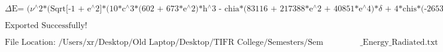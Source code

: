 \documentclass{article}
\begin{document}
\begin{doublespace}
\noindent\(\text{$\Delta $E= ($\nu {}^{\wedge}$2*(Sqrt[-1 + e${}^{\wedge}$2]*(10*c${}^{\wedge}$3*(602 + 673*e${}^{\wedge}$2)*h${}^{\wedge}$3 - chia*(83116
+ 217388*e${}^{\wedge}$2 + 40851*e${}^{\wedge}$4)*$\delta $ + 4*chis*(-26536 - 5757*$\delta {}^{\wedge}$2 + 10426*$\eta $ + 25720*$\nu $) + chis*e${}^{\wedge}$2*(-304892
- 87504*$\delta {}^{\wedge}$2 + 94772*$\eta $ + 369640*$\nu $ + e${}^{\wedge}$2*(-69234 - 28383*$\delta {}^{\wedge}$2 + 444*$\eta $ + 113380*$\nu
$))) - 15*(-2*c${}^{\wedge}$3*(96 + 292*e${}^{\wedge}$2 + 37*e${}^{\wedge}$4)*h${}^{\wedge}$3 + chia*(2384 + 13416*e${}^{\wedge}$2 + 6762*e${}^{\wedge}$4
+ 195*e${}^{\wedge}$6)*$\delta $ + chis*(3*e${}^{\wedge}$4*(3472 + 1218*$\delta {}^{\wedge}$2 - 580*$\eta $ + e${}^{\wedge}$2*(134 + 69*$\delta {}^{\wedge}$2
+ 44*$\eta $ - 268*$\nu $) - 4976*$\nu $) + 8*e${}^{\wedge}$2*(2274 + 597*$\delta {}^{\wedge}$2 - 792*$\eta $ - 2564*$\nu $) + 16*(188 + 39*$\delta
{}^{\wedge}$2 - 74*$\eta $ - 176*$\nu $)))*ArcSec[-e]))/(225*c${}^{\wedge}$8*h${}^{\wedge}$10)}\)
\end{doublespace}

\noindent\(\text{Exported Successfully!}\)

\noindent\(\text{File Location: }\text{/Users/xr/Desktop/Old Laptop/Desktop/TIFR College/Semesters/Sem 4/Departmental Project 1/Mathematica Codes/1.5PN$\_$Energy$\_$Radiated.txt}\)
\end{document}

